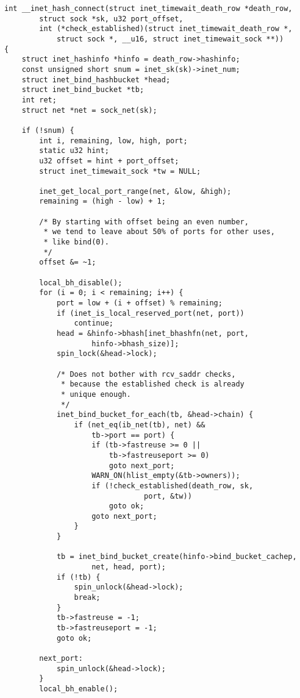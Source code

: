 \begin{verbatim}
int __inet_hash_connect(struct inet_timewait_death_row *death_row,
        struct sock *sk, u32 port_offset,
        int (*check_established)(struct inet_timewait_death_row *,
            struct sock *, __u16, struct inet_timewait_sock **))
{
    struct inet_hashinfo *hinfo = death_row->hashinfo;
    const unsigned short snum = inet_sk(sk)->inet_num;
    struct inet_bind_hashbucket *head;
    struct inet_bind_bucket *tb;
    int ret;
    struct net *net = sock_net(sk);

    if (!snum) {
        int i, remaining, low, high, port;
        static u32 hint;
        u32 offset = hint + port_offset;
        struct inet_timewait_sock *tw = NULL;

        inet_get_local_port_range(net, &low, &high);
        remaining = (high - low) + 1;

        /* By starting with offset being an even number,
         * we tend to leave about 50% of ports for other uses,
         * like bind(0).
         */
        offset &= ~1;

        local_bh_disable();
        for (i = 0; i < remaining; i++) {
            port = low + (i + offset) % remaining;
            if (inet_is_local_reserved_port(net, port))
                continue;
            head = &hinfo->bhash[inet_bhashfn(net, port,
                    hinfo->bhash_size)];
            spin_lock(&head->lock);

            /* Does not bother with rcv_saddr checks,
             * because the established check is already
             * unique enough.
             */
            inet_bind_bucket_for_each(tb, &head->chain) {
                if (net_eq(ib_net(tb), net) &&
                    tb->port == port) {
                    if (tb->fastreuse >= 0 ||
                        tb->fastreuseport >= 0)
                        goto next_port;
                    WARN_ON(hlist_empty(&tb->owners));
                    if (!check_established(death_row, sk,
                                port, &tw))
                        goto ok;
                    goto next_port;
                }
            }

            tb = inet_bind_bucket_create(hinfo->bind_bucket_cachep,
                    net, head, port);
            if (!tb) {
                spin_unlock(&head->lock);
                break;
            }
            tb->fastreuse = -1;
            tb->fastreuseport = -1;
            goto ok;

        next_port:
            spin_unlock(&head->lock);
        }
        local_bh_enable();


\end{verbatim}
